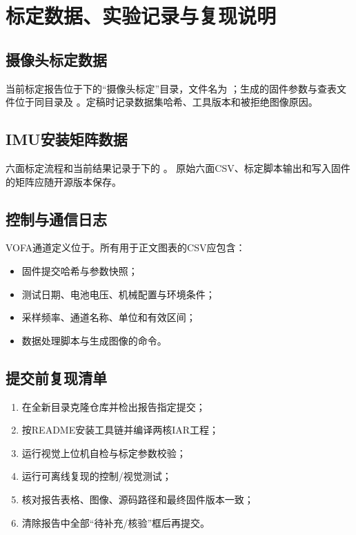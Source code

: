 \chapter{标定数据、实验记录与复现说明}

\section{摄像头标定数据}

当前标定报告位于下的“摄像头标定”目录，文件名为
；生成的固件参数与查表文件位于同目录及
。定稿时记录数据集哈希、工具版本和被拒绝图像原因。

\section{IMU安装矩阵数据}

六面标定流程和当前结果记录于下的
。
原始六面CSV、标定脚本输出和写入固件的矩阵应随开源版本保存。

\section{控制与通信日志}

VOFA通道定义位于。所有用于正文图表的CSV应包含：
\begin{itemize}
  \item 固件提交哈希与参数快照；
  \item 测试日期、电池电压、机械配置与环境条件；
  \item 采样频率、通道名称、单位和有效区间；
  \item 数据处理脚本与生成图像的命令。
\end{itemize}

\section{提交前复现清单}

\begin{enumerate}
  \item 在全新目录克隆仓库并检出报告指定提交；
  \item 按README安装工具链并编译两核IAR工程；
  \item 运行视觉上位机自检与标定参数校验；
  \item 运行可离线复现的控制/视觉测试；
  \item 核对报告表格、图像、源码路径和最终固件版本一致；
  \item 清除报告中全部“待补充/核验”框后再提交。
\end{enumerate}
